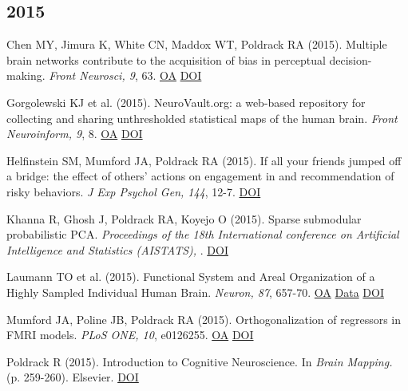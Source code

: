 \subsection*{2015}

Chen MY, Jimura K, White CN, Maddox WT, Poldrack RA (2015). Multiple brain networks contribute to the acquisition of bias in perceptual decision-making. \textit{Front Neurosci, 9}, 63. \href{https://www.ncbi.nlm.nih.gov/pmc/articles/PMC4350407}{OA} \href{http://dx.doi.org/10.3389/fnins.2015.00063}{DOI} \vspace{2mm}

Gorgolewski KJ et al. (2015). NeuroVault.org: a web-based repository for collecting and sharing unthresholded statistical maps of the human brain. \textit{Front Neuroinform, 9}, 8. \href{https://www.ncbi.nlm.nih.gov/pmc/articles/PMC4392315}{OA} \href{http://dx.doi.org/10.3389/fninf.2015.00008}{DOI} \vspace{2mm}

Helfinstein SM, Mumford JA, Poldrack RA (2015). If all your friends jumped off a bridge: the effect of others' actions on engagement in and recommendation of risky behaviors. \textit{J Exp Psychol Gen, 144}, 12-7. \href{http://dx.doi.org/10.1037/xge0000043}{DOI} \vspace{2mm}

Khanna R, Ghosh J, Poldrack RA, Koyejo O (2015). Sparse submodular probabilistic PCA. \textit{Proceedings of the 18th International conference on Artificial Intelligence and Statistics (AISTATS), }. \href{http://dx.doi.org/pnawvqzs}{DOI} \vspace{2mm}

Laumann TO et al. (2015). Functional System and Areal Organization of a Highly Sampled Individual Human Brain. \textit{Neuron, 87}, 657-70. \href{https://www.ncbi.nlm.nih.gov/pmc/articles/PMC4642864}{OA} \href{https://openneuro.org/datasets/ds000031/versions/00001}{Data} \href{http://dx.doi.org/10.1016/j.neuron.2015.06.037}{DOI} \vspace{2mm}

Mumford JA, Poline JB, Poldrack RA (2015). Orthogonalization of regressors in FMRI models. \textit{PLoS ONE, 10}, e0126255. \href{https://www.ncbi.nlm.nih.gov/pmc/articles/PMC4412813}{OA} \href{http://dx.doi.org/10.1371/journal.pone.0126255}{DOI} \vspace{2mm}

Poldrack R (2015). Introduction to Cognitive Neuroscience. In \textit{Brain Mapping.} (p. 259-260). Elsevier. \href{http://dx.doi.org/10.1016/b978-0-12-397025-1.09990-5}{DOI} \vspace{2mm}

